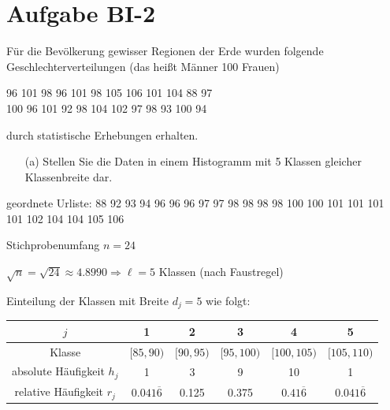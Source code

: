 
\section{Aufgabe BI-2}

\begin{task}
    Für die Bevölkerung gewisser Regionen der Erde wurden folgende Geschlechterverteilungen (das heißt Männer 100 Frauen)
    \begin{tightcenter}
        96  101  98  96  101  98  105  106  101  104  88  97 \\
        100  96  101  92  98  104  102  97  98  93  100  94
    \end{tightcenter}
    durch statistische Erhebungen erhalten.

    \begin{enumerate}
        \item[(a)] Stellen Sie die Daten in einem Histogramm mit 5 Klassen gleicher Klassenbreite dar.
    \end{enumerate}
\end{task}

geordnete Urliste: 88 92 93 94 96 96 96 97 97 98 98 98 98 100 100 101 101 101 101 102 104 104 105 106

Stichprobenumfang $n=24$

$\sqrt{n} = \sqrt{24} \approx 4.8990 \Rightarrow \ell=5$ Klassen (nach Faustregel)

Einteilung der Klassen mit Breite $d_j=5$ wie folgt:

\begin{table}[H]
\centering
\begin{tabular}{c|ccccc}
    $j$                       & 1                   & 2         & 3          & 4                  & 5                   \\ \hline
    Klasse                    & $[85,90)$           & $[90,95)$ & $[95,100)$ & $[100,105)$        & $[105,110)$         \\
    absolute Häufigkeit $h_j$ & 1                   & 3         & 9          & 10                 & 1                   \\
    relative Häufigkeit $r_j$ & $0.041\overline{6}$ & 0.125     & 0.375      & $0.41\overline{6}$ & $0.041\overline{6}$
\end{tabular}
\end{table}

